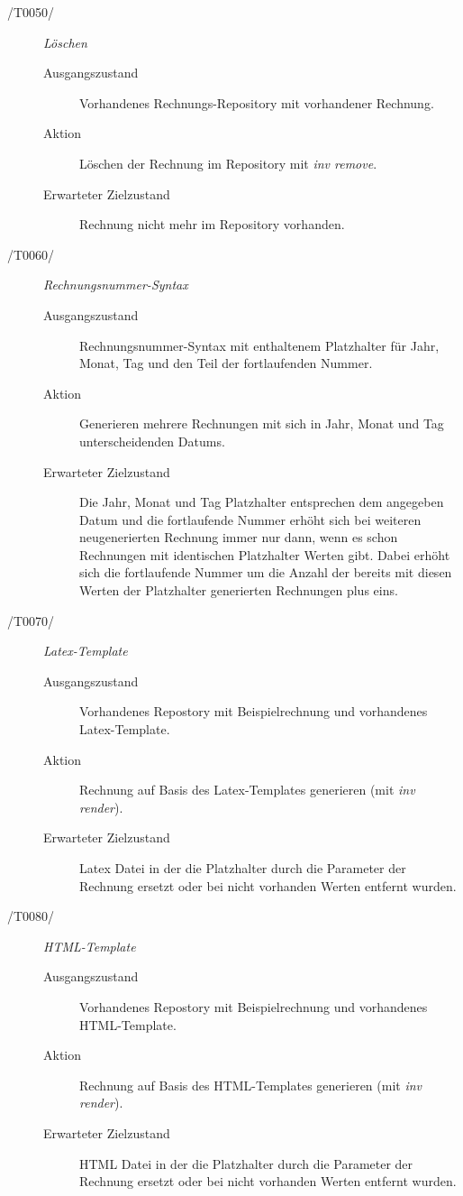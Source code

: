 \begin{description}
  \item[/T0050/]
	\textit{Löschen}
	\begin{description}
		\item[Ausgangszustand]
		Vorhandenes Rechnungs-Repository mit vorhandener Rechnung.
		\item[Aktion]
		Löschen der Rechnung im Repository mit \textit{inv remove}.
		\item[Erwarteter Zielzustand]
		Rechnung nicht mehr im Repository vorhanden.
	\end{description}

  \item[/T0060/]
	\textit{Rechnungsnummer-Syntax}
	\begin{description}
		\item[Ausgangszustand]
		Rechnungsnummer-Syntax mit enthaltenem Platzhalter für Jahr, Monat, Tag und den Teil der fortlaufenden Nummer.
		\item[Aktion]
		Generieren mehrere Rechnungen mit sich in Jahr, Monat und Tag unterscheidenden Datums.
		\item[Erwarteter Zielzustand]
		Die Jahr, Monat und Tag Platzhalter entsprechen dem angegeben Datum und die fortlaufende Nummer erhöht sich bei weiteren neugenerierten Rechnung immer nur dann, wenn es schon Rechnungen mit identischen Platzhalter Werten gibt. Dabei erhöht sich die fortlaufende Nummer um die Anzahl der bereits mit diesen Werten der Platzhalter generierten Rechnungen plus eins.
	\end{description}

  \item[/T0070/]
	\textit{Latex-Template}
	\begin{description}
		\item[Ausgangszustand]
		Vorhandenes Repostory mit Beispielrechnung und vorhandenes Latex-Template.
		\item[Aktion]
		Rechnung auf Basis des Latex-Templates generieren (mit \textit{inv render}).
		\item[Erwarteter Zielzustand]
		Latex Datei in der die Platzhalter durch die Parameter der Rechnung ersetzt oder bei nicht vorhanden Werten entfernt wurden.
	\end{description}

  \item[/T0080/]
	\textit{HTML-Template}
	\begin{description}
		\item[Ausgangszustand]
		Vorhandenes Repostory mit Beispielrechnung und vorhandenes HTML-Template.
		\item[Aktion]
		Rechnung auf Basis des HTML-Templates generieren (mit \textit{inv render}).
		\item[Erwarteter Zielzustand]
		HTML Datei in der die Platzhalter durch die Parameter der Rechnung ersetzt oder bei nicht vorhanden Werten entfernt wurden.
	\end{description}
\end{description}
